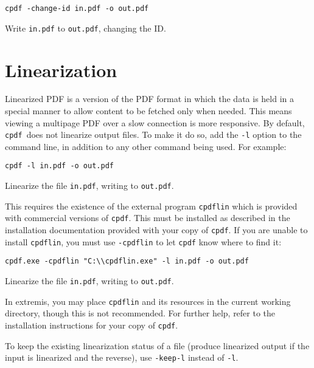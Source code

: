 \documentclass{book}
\newcommand{\cpdf}{\texttt{cpdf}}
\begin{document}
\begin{framed}
\small\verb!cpdf -change-id in.pdf -o out.pdf!

\vspace{2.5mm}
\noindent Write \texttt{in.pdf} to \texttt{out.pdf}, changing the ID.
\end{framed}

\section{Linearization}
Linearized PDF is a version of the PDF format in which the data is held in a
special manner to allow content to be fetched only when needed. This means
viewing a multipage PDF over a slow connection is more responsive. By default,
\cpdf\ does not linearize output files. To make it do so, add the \texttt{-l}
option to the command line, in addition to any other command being used. For example:

\begin{framed}
\small\verb!cpdf -l in.pdf -o out.pdf!

\vspace{2.5mm}
\noindent Linearize the file \texttt{in.pdf}, writing to \texttt{out.pdf}.
\end{framed}

\noindent This requires the existence of the external program \texttt{cpdflin} which is provided with commercial versions of \texttt{cpdf}. This must be installed as described in the installation documentation provided with your copy of \texttt{cpdf}. If you are unable to install \texttt{cpdflin}, you must use \texttt{-cpdflin} to let \texttt{cpdf} know where to find it:

\begin{framed}
\small\verb!cpdf.exe -cpdflin "C:\\cpdflin.exe" -l in.pdf -o out.pdf!

\vspace{2.5mm}
\noindent Linearize the file \texttt{in.pdf}, writing to \texttt{out.pdf}.
\end{framed}

\noindent In extremis, you may place \texttt{cpdflin} and its resources in the current working directory, though this is not recommended. For further help, refer to the installation instructions for your copy of \texttt{cpdf}.

To keep the existing linearization status of a file (produce linearized output if the input is linearized and the reverse), use \texttt{-keep-l} instead of \texttt{-l}.
\end{document}
